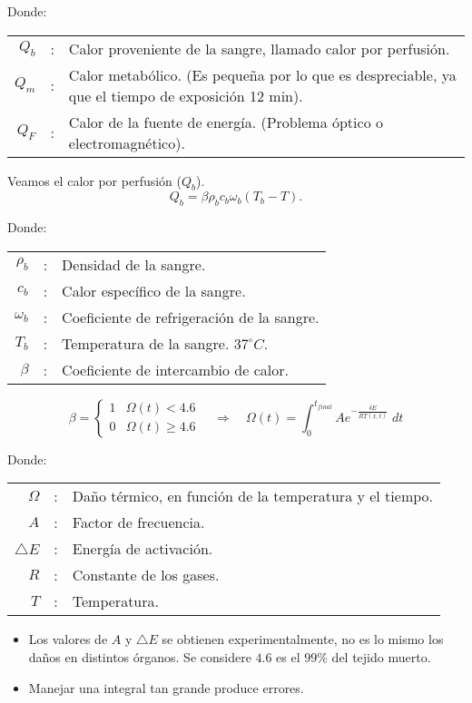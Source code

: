 Donde:
\begin{center}
    \begin{tabular}{rcl}
	$Q_b$ &:& Calor proveniente de la sangre, llamado calor por perfusión.\\ 
	$Q_m$ &:& Calor metabólico. (Es pequeña por lo que es despreciable, ya que el tiempo de exposición 12 min).\\
	$Q_F$ &:& Calor de la fuente de energía. (Problema óptico o electromagnético).
    \end{tabular}
\end{center}

Veamos el calor por perfusión ($Q_b$).
$$Q_b=\beta \rho_b c_b \omega_b(T_b-T).$$

Donde:
\begin{center}
	\begin{tabular}{rcl}
	$\rho_b$ &:& Densidad de la sangre.\\
	$c_b$ &:& Calor específico de la sangre.\\
	$\omega_b$ &:& Coeficiente de refrigeración de la sangre.\\
	$T_b$ &:& Temperatura de la sangre. $37^{\circ}C$.\\
	$\beta$ &:& Coeficiente de intercambio de calor.\\ 
	\end{tabular}
\end{center}

$$
\beta=\left\{
\begin{array}{ll}
    1 & \Omega(t)<4.6\\
    0 & \Omega(t)\geq 4.6
\end{array}
\right.
\quad \Rightarrow \quad
\Omega(t)=\int_{0}^{t_{final}} Ae^{-\frac{\delta E}{RT(x,t)}}\;dt
$$


Donde:
\begin{center}
    \begin{tabular}{rcl}
	$\Omega$ &:& Daño térmico, en función de la temperatura y el tiempo.\\
	$A$ &:& Factor de frecuencia.\\
	$\triangle E$ &:& Energía de activación.\\
	$R$ &:& Constante de los gases.\\
	$T$ &:& Temperatura.
    \end{tabular}
\end{center}

\begin{itemize}
    \item Los valores de $A$ y $\triangle E$ se obtienen experimentalmente, no es lo mismo los daños en distintos órganos. Se considere $4.6$ es el $99\%$ del tejido muerto.
    \item Manejar una integral tan grande produce errores.
\end{itemize}

